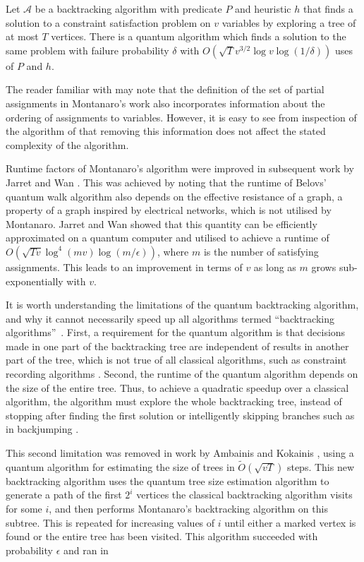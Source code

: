 \begin{theorem}
\label{thm:backtrack}
Let $\mathcal{A}$ be a backtracking algorithm with predicate $P$ and heuristic $h$ that finds a solution to a constraint satisfaction problem on $v$ variables by exploring a tree of at most $T$ vertices. There is a quantum algorithm which finds a solution to the same problem with failure probability $\delta$ with $O(\sqrt{T}v^{3/2}\log v\log(1/\delta))$ uses of $P$ and $h$.
\end{theorem}

The reader familiar with \cite{montanaro2015} may note that the definition of the set of partial assignments in Montanaro's work also incorporates information about the ordering of assignments to variables. However, it is easy to see from inspection of the algorithm of \cite{montanaro2015} that removing this information does not affect the stated complexity of the algorithm.

Runtime factors of Montanaro's algorithm were improved in subsequent work by Jarret and Wan \cite{jarret2018}. This was achieved by noting that the runtime of Belovs' quantum walk algorithm also depends on the effective resistance of a graph, a property of a graph inspired by electrical networks, which is not utilised by Montanaro. Jarret and Wan showed that this quantity can be efficiently approximated on a quantum computer and utilised to achieve a runtime of $O(\sqrt{Tv}\log^4(mv)\log(m/\epsilon))$, where $m$ is the number of satisfying assignments. This leads to an improvement in terms of $v$ as long as $m$ grows sub-exponentially with $v$.

It is worth understanding the limitations of the quantum backtracking algorithm, and why it cannot necessarily speed up all algorithms termed ``backtracking algorithms''~\cite{montanaro2015}. First, a requirement for the quantum algorithm is that decisions made in one part of the backtracking tree are independent of results in another part of the tree, which is not true of all classical algorithms, such as constraint recording algorithms \cite{dechter1990}. Second, the runtime of the quantum algorithm depends on the size of the entire tree. Thus, to achieve a quadratic speedup over a classical algorithm, the algorithm must explore the whole backtracking tree, instead of stopping after finding the first solution or intelligently skipping branches such as in backjumping \cite{dechter1990}.

This second limitation was removed in work by Ambainis and Kokainis \cite{ambainis2017}, using a quantum algorithm for estimating the size of trees in $\tilde{O}(\sqrt{vT})$ steps. This new backtracking algorithm uses the quantum tree size estimation algorithm to generate a path of the first $2^i$ vertices the classical backtracking algorithm visits for some $i$, and then performs Montanaro's backtracking algorithm on this subtree. This is repeated for increasing values of $i$ until either a marked vertex is found or the entire tree has been visited. This algorithm succeeded with probability $\epsilon$ and ran in

